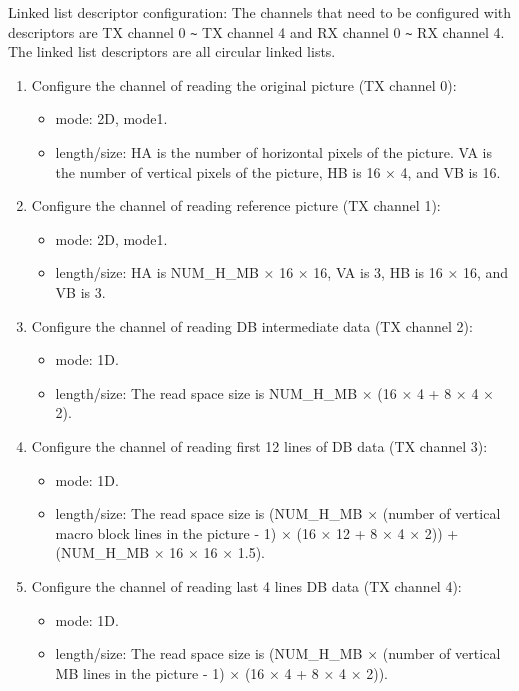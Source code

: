 \documentclass[main\_\_EN.tex]{subfiles}
\begin{document}
Linked list descriptor configuration: The channels that need to be configured with descriptors are TX channel 0 \verb+~+ TX channel 4 and RX channel 0 \verb+~+ RX channel 4. The linked list descriptors are all circular linked lists.
\begin{enumerate}
    \item Configure the channel of reading the original picture (TX channel 0):
    \begin{itemize}
        \item mode: 2D, mode1.
        \item length/size: HA is the number of horizontal pixels of the picture. VA is the number of vertical pixels of the picture, HB is 16 × 4, and VB is 16.
    \end{itemize}
    \item Configure the channel of reading reference picture (TX channel 1):
    \begin{itemize}
        \item mode: 2D, mode1.
        \item length/size: HA is NUM\_H\_MB × 16 × 16, VA is 3, HB is 16 × 16, and VB is 3.
    \end{itemize}
    \item Configure the channel of reading DB intermediate data (TX channel 2):
    \begin{itemize}
        \item mode: 1D.
        \item length/size: The read space size is NUM\_H\_MB × (16 × 4 + 8 × 4 × 2).
    \end{itemize}
    \item Configure the channel of reading first 12 lines of DB data (TX channel 3):
    \begin{itemize}
        \item mode: 1D.
        \item length/size: The read space size is (NUM\_H\_MB × (number of vertical macro block lines in the picture - 1) × (16 × 12 + 8 × 4 × 2)) + (NUM\_H\_MB × 16 × 16 × 1.5).
    \end{itemize}
    \item Configure the channel of reading last 4 lines DB data (TX channel 4):
    \begin{itemize}
        \item mode: 1D.
        \item length/size: The read space size is (NUM\_H\_MB × (number of vertical MB lines in the picture - 1) × (16 × 4 + 8 × 4 × 2)).

\end{itemize}
\end{enumerate}
\end{document}
